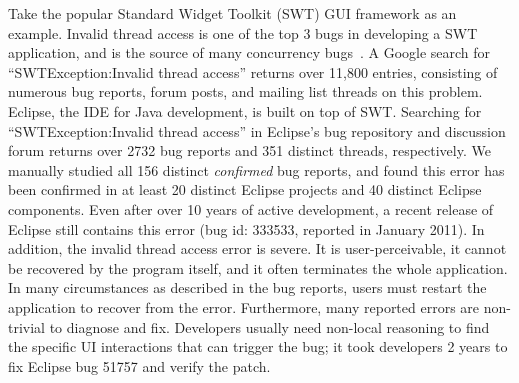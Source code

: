 Take the popular Standard Widget Toolkit (SWT) GUI framework as an example. 
Invalid thread access is one of the top 3 bugs in developing a SWT application, and is
the source of many concurrency bugs~\cite{top3bugs}.
A Google search for ``SWTException:Invalid thread access''  returns over 11,800 entries,
consisting of numerous bug reports, forum posts, and mailing list threads on
this problem. Eclipse, the IDE for Java development, is built on top of SWT\@.
Searching for ``SWTException:Invalid thread access'' in Eclipse's bug repository
and discussion forum returns over 2732 bug reports and 351 distinct threads, respectively. 
We manually studied all 156 distinct \textit{confirmed} bug reports, and 
found this error has been confirmed in at least 20 distinct Eclipse projects
and 40 distinct Eclipse components. Even after over 10 years of active development,
a recent release of Eclipse still contains this error (bug id: 333533, reported in January 2011).
 In addition, the invalid thread access error
is severe. It is user-perceivable, it cannot be recovered by the program itself,
and it often terminates the whole application. In many circumstances as described in the bug reports,
users must restart the application to recover from the error.
Furthermore, many reported  errors are non-trivial to diagnose and fix.
Developers usually need non-local reasoning to find the specific
UI interactions that can trigger the bug;  it took developers 2 years
to fix Eclipse bug 51757 and verify the patch.

